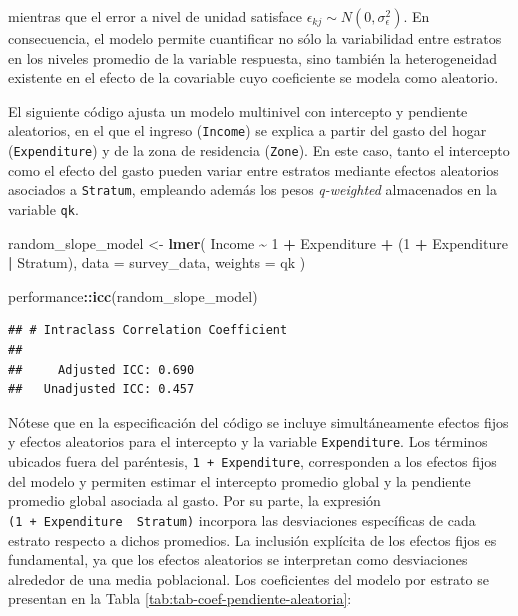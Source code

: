 \documentclass[
  spanish,
  12pt,
]{book}
\newenvironment{Shaded}{\begin{snugshade}}{\end{snugshade}}
\newcommand{\AttributeTok}[1]{\textcolor[rgb]{0.13,0.29,0.53}{#1}}
\newcommand{\DecValTok}[1]{\textcolor[rgb]{0.00,0.00,0.81}{#1}}
\newcommand{\FunctionTok}[1]{\textcolor[rgb]{0.13,0.29,0.53}{\textbf{#1}}}
\newcommand{\NormalTok}[1]{#1}
\newcommand{\OtherTok}[1]{\textcolor[rgb]{0.56,0.35,0.01}{#1}}
\newcommand{\SpecialCharTok}[1]{\textcolor[rgb]{0.81,0.36,0.00}{\textbf{#1}}}
\begin{document}
mientras que el error a nivel de unidad satisface \(\epsilon_{kj} \sim N(0,\sigma_{\epsilon}^{2})\). En consecuencia, el modelo permite cuantificar no sólo la variabilidad entre estratos en los niveles promedio de la variable respuesta, sino también la heterogeneidad existente en el efecto de la covariable cuyo coeficiente se modela como aleatorio.

El siguiente código ajusta un modelo multinivel con intercepto y pendiente aleatorios, en el que el ingreso (\texttt{Income}) se explica a partir del gasto del hogar (\texttt{Expenditure}) y de la zona de residencia (\texttt{Zone}). En este caso, tanto el intercepto como el efecto del gasto pueden variar entre estratos mediante efectos aleatorios asociados a \texttt{Stratum}, empleando además los pesos \emph{q-weighted} almacenados en la variable \texttt{qk}.

\begin{Shaded}
\begin{Highlighting}[]
\NormalTok{random\_slope\_model }\OtherTok{\textless{}{-}} \FunctionTok{lmer}\NormalTok{(}
\NormalTok{  Income }\SpecialCharTok{\textasciitilde{}} \DecValTok{1} \SpecialCharTok{+}\NormalTok{ Expenditure }\SpecialCharTok{+}\NormalTok{ (}\DecValTok{1} \SpecialCharTok{+}\NormalTok{ Expenditure }\SpecialCharTok{|}\NormalTok{ Stratum),}
  \AttributeTok{data =}\NormalTok{ survey\_data,}
  \AttributeTok{weights =}\NormalTok{ qk}
\NormalTok{)}

\NormalTok{performance}\SpecialCharTok{::}\FunctionTok{icc}\NormalTok{(random\_slope\_model)}
\end{Highlighting}
\end{Shaded}

\begin{verbatim}
## # Intraclass Correlation Coefficient
## 
##     Adjusted ICC: 0.690
##   Unadjusted ICC: 0.457
\end{verbatim}

Nótese que en la especificación del código se incluye simultáneamente efectos fijos y efectos aleatorios para el intercepto y la variable \texttt{Expenditure}. Los términos ubicados fuera del paréntesis, \texttt{1\ +\ Expenditure}, corresponden a los efectos fijos del modelo y permiten estimar el intercepto promedio global y la pendiente promedio global asociada al gasto. Por su parte, la expresión \texttt{(1\ +\ Expenditure\ \textbar{}\ Stratum)} incorpora las desviaciones específicas de cada estrato respecto a dichos promedios. La inclusión explícita de los efectos fijos es fundamental, ya que los efectos aleatorios se interpretan como desviaciones alrededor de una media poblacional. Los coeficientes del modelo por estrato se presentan en la Tabla \ref{tab:tab-coef-pendiente-aleatoria}:
\end{document}
